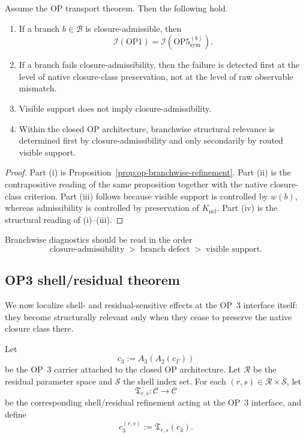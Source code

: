 \begin{theorem}\label{thm:admissible-branch}
Assume the OP transport theorem. Then the following hold.
\begin{enumerate}[leftmargin=2em,label=(\roman*)]
\item If a branch $b\in\mathcal{B}$ is closure-admissible, then
\[
\mathcal{I}(\mathrm{OP1})=\mathcal{I}(\mathrm{OP5}^{(b)}_{\mathrm{sym}}).
\]
\item If a branch fails closure-admissibility, then the failure is detected first at the level of native closure-class preservation, not at the level of raw observable mismatch.
\item Visible support does not imply closure-admissibility.
\item Within the closed OP architecture, branchwise structural relevance is determined first by closure-admissibility and only secondarily by routed visible support.
\end{enumerate}
\end{theorem}

\begin{proof}
Part (i) is Proposition~\ref{prop:op-branchwise-refinement}. Part (ii) is the contrapositive reading of the same proposition together with the native closure-class criterion. Part (iii) follows because visible support is controlled by $w(b)$, whereas admissibility is controlled by preservation of $K_{\mathrm{ncl}}$. Part (iv) is the structural reading of (i)--(iii).
\end{proof}

\begin{corollary}
Branchwise diagnostics should be read in the order
\[
\text{closure-admissibility}
\;>\;
\text{branch defect}
\;>\;
\text{visible support}.
\]
\end{corollary}

\subsection{OP3 shell/residual theorem}
\label{sec:op3-shell-theorem}

We now localize shell- and residual-sensitive effects at the OP~3 interface itself: they become structurally relevant only when they cease to preserve the native closure class there.

Let
\[
c_{3}:=A_{3}(A_{2}(c_{\Gamma}))
\]
be the OP~3 carrier attached to the closed OP architecture. Let $\mathcal{R}$ be the residual parameter space and $\mathcal{S}$ the shell index set. For each $(r,s)\in\mathcal{R}\times\mathcal{S}$, let
\[
\mathfrak{T}_{r,s}:\mathcal{C}\to\mathcal{C}
\]
be the corresponding shell/residual refinement acting at the OP~3 interface, and define
\[
c_{3}^{(r,s)}:=\mathfrak{T}_{r,s}(c_{3}).
\]

